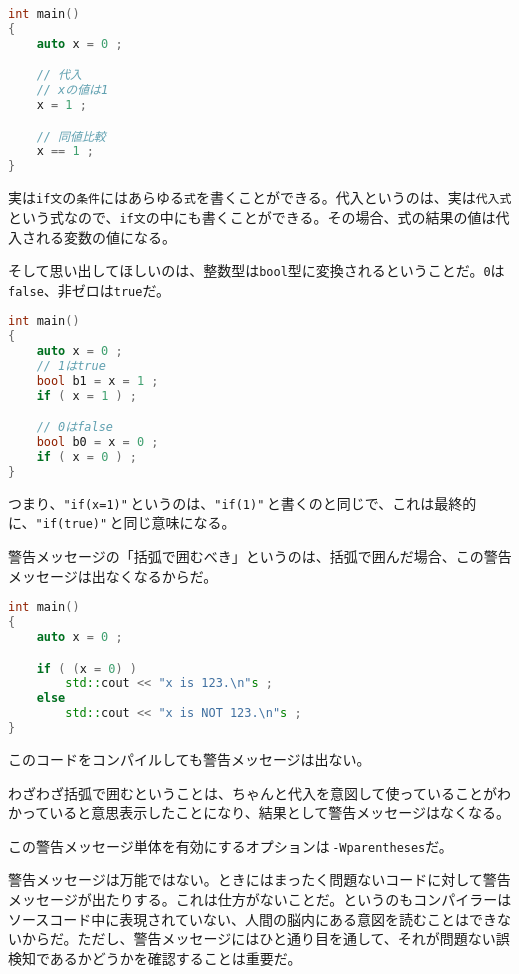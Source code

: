 \begin{lstlisting}[language={C++}]
int main()
{
    auto x = 0 ;

    // 代入
    // xの値は1
    x = 1 ;

    // 同値比較
    x == 1 ;
}
\end{lstlisting}

実は\texttt{if文}の\texttt{条件}にはあらゆる\texttt{式}を書くことができる。代入というのは、実は\texttt{代入式}という式なので、\texttt{if文}の中にも書くことができる。その場合、式の結果の値は代入される変数の値になる。

そして思い出してほしいのは、整数型は\texttt{bool}型に変換されるということだ。\texttt{0}は\texttt{false}、非ゼロは\texttt{true}だ。

\begin{lstlisting}[language={C++}]
int main()
{
    auto x = 0 ;
    // 1はtrue
    bool b1 = x = 1 ;
    if ( x = 1 ) ;

    // 0はfalse
    bool b0 = x = 0 ;
    if ( x = 0 ) ;
}
\end{lstlisting}

つまり、\texttt{"if(x=1)"}\,というのは、\texttt{"if(1)"}\,と書くのと同じで、これは最終的に、\texttt{"if(true)"}\,と同じ意味になる。

警告メッセージの「括弧で囲むべき」というのは、括弧で囲んだ場合、この警告メッセージは出なくなるからだ。

\begin{lstlisting}[language={C++}]
int main()
{
    auto x = 0 ;

    if ( (x = 0) )
        std::cout << "x is 123.\n"s ;
    else
        std::cout << "x is NOT 123.\n"s ;
}
\end{lstlisting}

このコードをコンパイルしても警告メッセージは出ない。

わざわざ括弧で囲むということは、ちゃんと代入を意図して使っていることがわかっていると意思表示したことになり、結果として警告メッセージはなくなる。

この警告メッセージ単体を有効にするオプションは\,\texttt{-Wparentheses}だ。

警告メッセージは万能ではない。ときにはまったく問題ないコードに対して警告メッセージが出たりする。これは仕方がないことだ。というのもコンパイラーはソースコード中に表現されていない、人間の脳内にある意図を読むことはできないからだ。ただし、警告メッセージにはひと通り目を通して、それが問題ない誤検知であるかどうかを確認することは重要だ。
